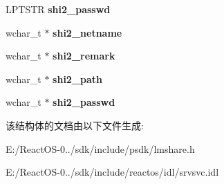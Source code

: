 \begin{DoxyCompactItemize}
L\+P\+T\+S\+TR {\bfseries shi2\+\_\+passwd}
\item 
\mbox{\label{struct___s_h_a_r_e___i_n_f_o__2_af0180024c080e0621ac37535f70418b8}} 
wchar\+\_\+t $\ast$ {\bfseries shi2\+\_\+netname}
\item 
\mbox{\label{struct___s_h_a_r_e___i_n_f_o__2_a51de89bcd898e5de2b8a98a177265b79}} 
wchar\+\_\+t $\ast$ {\bfseries shi2\+\_\+remark}
\item 
\mbox{\label{struct___s_h_a_r_e___i_n_f_o__2_a9a67b88b9302252957a7d451085e0931}} 
wchar\+\_\+t $\ast$ {\bfseries shi2\+\_\+path}
\item 
\mbox{\label{struct___s_h_a_r_e___i_n_f_o__2_a69960d9bfc4d895bcbc22f11e70706ed}} 
wchar\+\_\+t $\ast$ {\bfseries shi2\+\_\+passwd}
\end{DoxyCompactItemize}


该结构体的文档由以下文件生成\+:\begin{DoxyCompactItemize}
\item 
E\+:/\+React\+O\+S-\/0../sdk/include/psdk/lmshare.\+h\item 
E\+:/\+React\+O\+S-\/0../sdk/include/reactos/idl/srvsvc.\+idl\end{DoxyCompactItemize}
